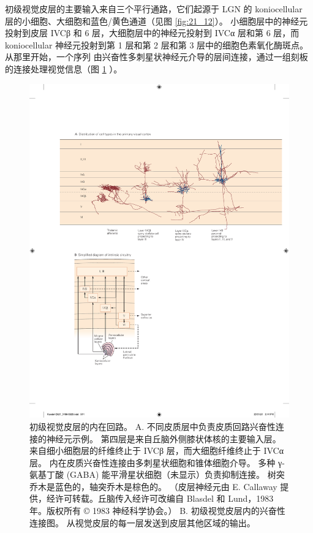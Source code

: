 初级视觉皮层的主要输入来自三个平行通路，它们起源于 LGN 的 koniocellular 层的小细胞、大细胞和蓝色/黄色通道（见图 \ref{fig:21_12}）。 
小细胞层中的神经元投射到皮层 IVCβ 和 6 层，大细胞层中的神经元投射到 IVCα 层和第 6 层，而 koniocellular 神经元投射到第 1 层和第 2 层和第 3 层中的细胞色素氧化酶斑点。
从那里开始，一个序列 由兴奋性多刺星状神经元介导的层间连接，通过一组刻板的连接处理视觉信息（图 \ref{fig:21_15} ）。

\begin{figure}[htbp]
	\centering
	\includegraphics[width=1.0\linewidth]{chap21/fig_21_15}
	\caption{初级视觉皮层的内在回路。 
		A. 不同皮质层中负责皮质回路兴奋性连接的神经元示例。 
		第四层是来自丘脑外侧膝状体核的主要输入层。 
		来自细小细胞层的纤维终止于 IVCβ 层，而大细胞纤维终止于 IVCα 层。 
		内在皮质兴奋性连接由多刺星状细胞和锥体细胞介导。 
		多种 γ-氨基丁酸 (GABA) 能平滑星状细胞（未显示）负责抑制连接。 
		树突乔木是蓝色的，轴突乔木是棕色的。 （皮层神经元由 E. Callaway 提供，经许可转载。丘脑传入经许可改编自 Blasdel 和 Lund，1983 年。版权所有 © 1983 神经科学协会。）
		B. 初级视觉皮层内的兴奋性连接图。 从视觉皮层的每一层发送到皮层其他区域的输出。}
	\label{fig:21_15}
\end{figure}


